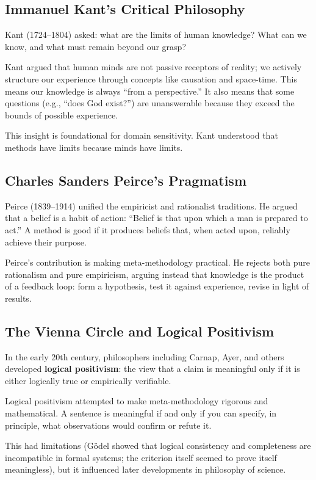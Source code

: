 \documentclass[11pt,letterpaper]{article}
\begin{document}
\subsection*{Immanuel Kant's Critical Philosophy}

Kant (1724--1804) asked: what are the limits of human knowledge? What can we know, and what must remain beyond our grasp?

Kant argued that human minds are not passive receptors of reality; we actively structure our experience through concepts like causation and space-time. This means our knowledge is always ``from a perspective.'' It also means that some questions (e.g., ``does God exist?'') are unanswerable because they exceed the bounds of possible experience.

This insight is foundational for domain sensitivity. Kant understood that methods have limits because minds have limits.

\subsection*{Charles Sanders Peirce's Pragmatism}

Peirce (1839--1914) unified the empiricist and rationalist traditions. He argued that a belief is a habit of action: ``Belief is that upon which a man is prepared to act.'' A method is good if it produces beliefs that, when acted upon, reliably achieve their purpose.

Peirce's contribution is making meta-methodology practical. He rejects both pure rationalism and pure empiricism, arguing instead that knowledge is the product of a feedback loop: form a hypothesis, test it against experience, revise in light of results.

\subsection*{The Vienna Circle and Logical Positivism}

In the early 20th century, philosophers including Carnap, Ayer, and others developed \textbf{logical positivism}: the view that a claim is meaningful only if it is either logically true or empirically verifiable.

Logical positivism attempted to make meta-methodology rigorous and mathematical. A sentence is meaningful if and only if you can specify, in principle, what observations would confirm or refute it.

This had limitations (Gödel showed that logical consistency and completeness are incompatible in formal systems; the criterion itself seemed to prove itself meaningless), but it influenced later developments in philosophy of science.
\end{document}
